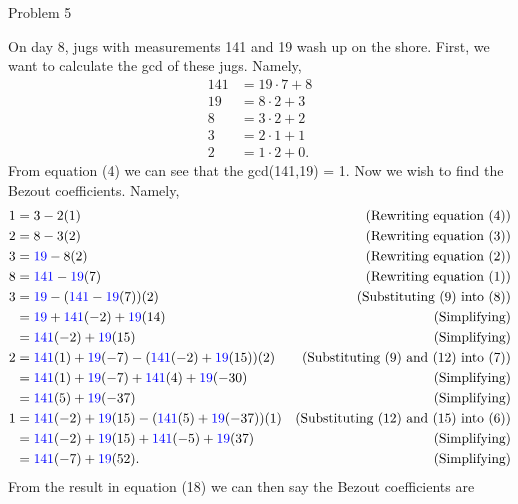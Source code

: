 \begin{problem}{Problem 5}
    \begin{highlight}[Solution]
        On day 8, jugs with measurements 141 and 19 wash up on the shore. First, we want to calculate the gcd of these jugs. Namely,
        \setcounter{equation}{0}
        \begin{align}
            141 & = 19 \cdot 7 + 8 \\
            19 & = 8 \cdot 2 + 3 \\
            8 & = 3 \cdot 2 + 2 \\
            3 & = 2 \cdot 1 + 1 \\
            2 & = 1 \cdot 2 + 0.
        \end{align}
        From equation (4) we can see that the gcd(141,19) = 1. Now we wish to find the Bezout coefficients. Namely,
        {\small
            \begin{align}
                1 & = 3 - 2(1) & \text{(Rewriting equation (4))} \\
                2 & = 8 - 3(2) & \text{(Rewriting equation (3))} \\
                3 & = \textcolor{blue}{19} - 8(2) & \text{(Rewriting equation (2))} \\
                8 & = \textcolor{blue}{141} - \textcolor{blue}{19}(7) & \text{(Rewriting equation (1))} \\
                3 & = \textcolor{blue}{19} - (\textcolor{blue}{141} - \textcolor{blue}{19}(7))(2) & \text{(Substituting (9) into (8))} \\
                & = \textcolor{blue}{19} + \textcolor{blue}{141}(-2) + \textcolor{blue}{19}(14) & \text{(Simplifying)} \\
                & = \textcolor{blue}{141}(-2) + \textcolor{blue}{19}(15) & \text{(Simplifying)} \\
                2 & = \textcolor{blue}{141}(1) + \textcolor{blue}{19}(-7) - (\textcolor{blue}{141}(-2) + \textcolor{blue}{19}(15))(2) & \text{(Substituting (9) and (12) into (7))} \\
                & = \textcolor{blue}{141}(1) + \textcolor{blue}{19}(-7) + \textcolor{blue}{141}(4) + \textcolor{blue}{19}(-30) & \text{(Simplifying)} \\
                & = \textcolor{blue}{141}(5) + \textcolor{blue}{19}(-37) & \text{(Simplifying)} \\
                1 & = \textcolor{blue}{141}(-2) + \textcolor{blue}{19}(15) - (\textcolor{blue}{141}(5) + \textcolor{blue}{19}(-37))(1) & \text{(Substituting (12) and (15) into (6))} \\
                & = \textcolor{blue}{141}(-2) + \textcolor{blue}{19}(15) + \textcolor{blue}{141}(-5) + \textcolor{blue}{19}(37) & \text{(Simplifying)} \\
                & = \textcolor{blue}{141}(-7) + \textcolor{blue}{19}(52). & \text{(Simplifying)}
            \end{align}
        }
        From the result in equation (18) we can then say the Bezout coefficients are


\end{highlight}
\end{problem}
